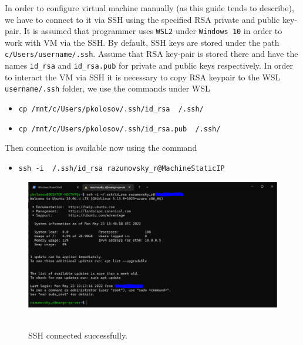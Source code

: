 In order to configure virtual machine manually (as this guide tends to describe),
we have to connect to it via SSH using the specified RSA private and public key-pair.
It is assumed that programmer uses \texttt{WSL2} under \texttt{Windows 10} in order to work with VM via the SSH\@.
By default, SSH keys are stored under the path \texttt{c/Users/username/.ssh}.
Assume that RSA key-pair is stored there and have the names \texttt{id\_rsa} and \texttt{id\_rsa.pub} for private
and public keys respectively.
In order to interact the VM via SSH it is necessary to copy RSA keypair to the WSL \texttt{username/.ssh} folder,
we use the commands under WSL
\begin{itemize}
    \item \texttt{cp /mnt/c/Users/pkolosov/.ssh/id\_rsa ~/.ssh/}
    \item \texttt{cp /mnt/c/Users/pkolosov/.ssh/id\_rsa.pub ~/.ssh/}
\end{itemize}
Then connection is available now using the command
\begin{itemize}
    \item \texttt{ssh -i ~/.ssh/id\_rsa razumovsky\_r@MachineStaticIP}
\end{itemize}
\begin{figure}[H]
    \centering
    \includegraphics[width=1\textwidth]{img/01_ssh_connected}
    ~\caption{SSH connected successfully.}\label{fig:figure}
\end{figure}
